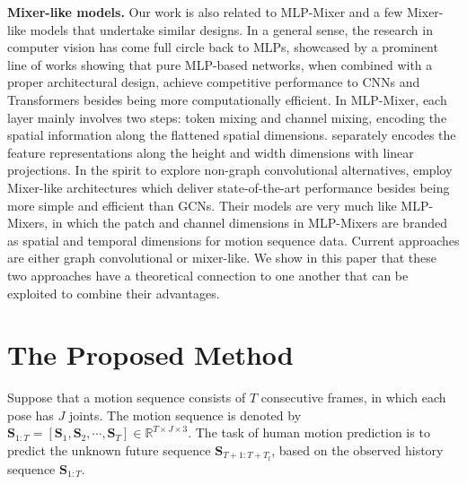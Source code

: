 \documentclass[10pt,twocolumn,letterpaper]{article}
\begin{document}
\noindent\textbf{Mixer-like models.}
    Our work is also related to MLP-Mixer \cite{tolstikhin2021mlp} and a few Mixer-like models that undertake similar designs.
In a general sense, the research in computer vision has come full circle back to MLPs, showcased by a prominent line of works
    \cite{tolstikhin2021mlp,touvron2022resmlp,hou2022vision,yu2022s2,guo2022hire,tang2022sparse,tu2022maxim} showing that pure MLP-based networks, when combined with a proper architectural design, achieve competitive performance to CNNs and Transformers \cite{vaswani2017attention} besides being more computationally efficient.
    In MLP-Mixer, each layer mainly involves two steps: token mixing and channel mixing, encoding the spatial information along the flattened spatial dimensions. \cite{hou2022vision} separately encodes the feature representations along the height and width dimensions with linear projections.
In the spirit to explore non-graph convolutional alternatives, \cite{bouazizi2022motionmixer,guo2023back} employ Mixer-like architectures which deliver state-of-the-art performance besides being more simple and efficient than GCNs. Their models are very much like MLP-Mixers, in which the patch and channel dimensions in MLP-Mixers are branded as spatial and temporal dimensions for motion sequence data.
    Current approaches are either graph convolutional or mixer-like.
    We show in this paper that these two approaches have a theoretical connection to one another that can be exploited to combine their advantages.















\section{The Proposed Method}


Suppose that a motion sequence consists of $T$ consecutive frames, in which each pose has $J$ joints.
The motion sequence is denoted by $\mathbf{S}_{1:T} = [ \mathbf{S}_{1}, \mathbf{S}_{2}, \cdots, \mathbf{S}_{T} ] \in \mathbb{R}^{T\times J\times 3}$.
The task of human motion prediction is to predict the unknown future sequence $\mathbf{S}_{T+1:T+T_\text{f}}$, based on the observed history sequence $\mathbf{S}_{1:T}$.
\end{document}

